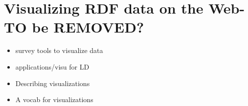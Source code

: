 \chapter{Visualizing RDF data on the Web-TO be REMOVED? }
\label{ch:ch3}

\begin{itemize}
\item survey tools to visualize data
\item applications/visu for LD
\item Describing visualizations 
\item A vocab for visualizations
\end{itemize}




